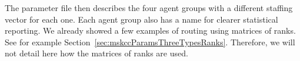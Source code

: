 The parameter file then describes the four agent groups with a different
staffing vector for each one.
Each agent group also has a name for clearer statistical reporting.
We already showed a few examples of routing using matrices of ranks.
See for example Section~\ref{sec:mskccParamsThreeTypesRanks}.
Therefore, we will not detail here how the matrices of ranks are
used.

\begin{comment}
The staffing vector of the first agent group is computed from a
schedule instead of being specified explicitly.
This schedule, set by the \texttt{schedule} element and applied to
all members of the group. gives a set of \emph{shifts}
encoded in the parameter file as \texttt{shift} elements.
Each shift is described as a set of time intervals also called
parts, and encoded as \texttt{shiftPart} elements, and
specifies the number of working agents.
Each part has an associated starting and ending times as well as
a type name.
The type indicates what agents
do during the interval.
At this time, \texttt{Working} is the only part type used by the
simulator.  Any other part type results in agents not being staffed
during the concerned period.


For example, the first shift specified in the schedule of the example
starts at 9AM.  A break starts at
11AM (i.e., beginning of
period~2), so agents work during periods~0, and 1.
The break ends at the beginning of period~3, and the agents work for
two additional periods at the end of this shift.
If this was the only specified shift, the resulting staffing vector
would be $(1, 1, 0, 1, 1)$.

The combination of the described shifts results in the staffing vector
specified in
the XML file. This is only a sample schedule; many other (maybe more
efficient) schedules would result in the same staffing vector.
\end{comment}

